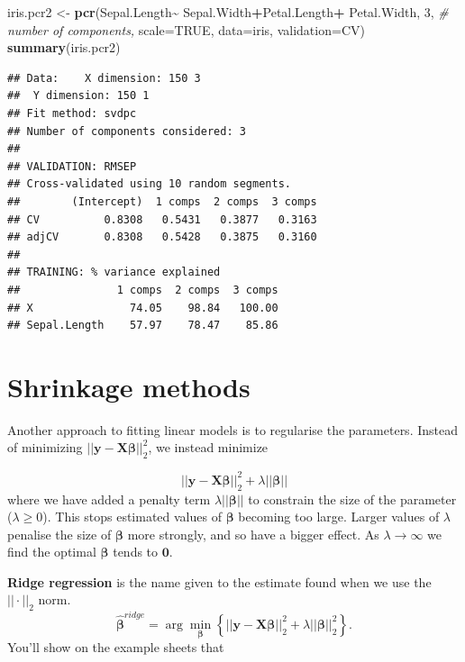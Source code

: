 \documentclass[
]{book}
\newenvironment{Shaded}{\begin{snugshade}}{\end{snugshade}}
\newcommand{\AttributeTok}[1]{\textcolor[rgb]{0.13,0.29,0.53}{#1}}
\newcommand{\CommentTok}[1]{\textcolor[rgb]{0.56,0.35,0.01}{\textit{#1}}}
\newcommand{\ConstantTok}[1]{\textcolor[rgb]{0.56,0.35,0.01}{#1}}
\newcommand{\DecValTok}[1]{\textcolor[rgb]{0.00,0.00,0.81}{#1}}
\newcommand{\FunctionTok}[1]{\textcolor[rgb]{0.13,0.29,0.53}{\textbf{#1}}}
\newcommand{\NormalTok}[1]{#1}
\newcommand{\OtherTok}[1]{\textcolor[rgb]{0.56,0.35,0.01}{#1}}
\newcommand{\SpecialCharTok}[1]{\textcolor[rgb]{0.81,0.36,0.00}{\textbf{#1}}}
\newcommand{\StringTok}[1]{\textcolor[rgb]{0.31,0.60,0.02}{#1}}
\theoremstyle{definition}
\theoremstyle{definition}
\theoremstyle{definition}
\theoremstyle{definition}
\theoremstyle{remark}
\begin{document}
\begin{Shaded}
\begin{Highlighting}[]
\NormalTok{iris.pcr2 }\OtherTok{\textless{}{-}} \FunctionTok{pcr}\NormalTok{(Sepal.Length}\SpecialCharTok{\textasciitilde{}}\NormalTok{ Sepal.Width}\SpecialCharTok{+}\NormalTok{Petal.Length}\SpecialCharTok{+}
\NormalTok{                   Petal.Width, }\DecValTok{3}\NormalTok{, }\CommentTok{\# number of components,}
                \AttributeTok{scale=}\ConstantTok{TRUE}\NormalTok{, }\AttributeTok{data=}\NormalTok{iris, }\AttributeTok{validation=}\StringTok{\textquotesingle{}CV\textquotesingle{}}\NormalTok{)}
\FunctionTok{summary}\NormalTok{(iris.pcr2)}
\end{Highlighting}
\end{Shaded}

\begin{verbatim}
## Data:    X dimension: 150 3 
##  Y dimension: 150 1
## Fit method: svdpc
## Number of components considered: 3
## 
## VALIDATION: RMSEP
## Cross-validated using 10 random segments.
##        (Intercept)  1 comps  2 comps  3 comps
## CV          0.8308   0.5431   0.3877   0.3163
## adjCV       0.8308   0.5428   0.3875   0.3160
## 
## TRAINING: % variance explained
##               1 comps  2 comps  3 comps
## X               74.05    98.84   100.00
## Sepal.Length    57.97    78.47    85.86
\end{verbatim}

\hypertarget{shrinkage-methods}{%
\section{Shrinkage methods}\label{shrinkage-methods}}

Another approach to fitting linear models is to regularise the parameters. Instead of minimizing \(||\mathbf y- \mathbf X\boldsymbol \beta||^2_2\), we instead minimize

\[||\mathbf y- \mathbf X\boldsymbol \beta||^2_2+\lambda||\boldsymbol \beta||\]
where we have added a penalty term \(\lambda||\boldsymbol \beta||\) to constrain the size of the parameter (\(\lambda\geq 0\)). This stops estimated values of \(\boldsymbol \beta\) becoming too large.
Larger values of \(\lambda\) penalise the size of \(\boldsymbol \beta\) more strongly, and so have a bigger effect. As \(\lambda \rightarrow \infty\) we find the optimal \(\boldsymbol \beta\) tends to \({\boldsymbol 0}\).

\textbf{Ridge regression} is the name given to the estimate found when we use the \(||\cdot||_2\) norm.
\[\hat{\boldsymbol \beta}^{ridge} = \arg \min_{\boldsymbol \beta} \left\{||\mathbf y- \mathbf X\boldsymbol \beta||^2_2+\lambda||\boldsymbol \beta||_2^2 \right\}.\]
You'll show on the example sheets that
\end{document}
